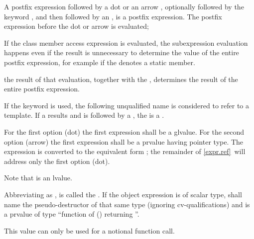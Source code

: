 \pnum
{}%
%
%
%
%
%
%
%
%
%
A postfix expression followed by a dot  or an arrow \tcode{->},
optionally followed by the keyword
, and then followed by an
, is a postfix expression. The postfix
expression before the dot or arrow is evaluated;
\begin{footnote}
If the class member
access expression is evaluated, the subexpression evaluation happens even if the
result is unnecessary to determine
the value of the entire postfix expression, for example if the
 denotes a static member.
\end{footnote}
the result of that evaluation, together with the
, determines the result of the entire postfix
expression.
\begin{note}
If the keyword  is used,
the following unqualified name
is considered to refer to a template.
If a  results and is followed by a \tcode{::},
the  is a .
\end{note}

\pnum
{}%
For the first option (dot) the first expression shall be a glvalue.
For the second option (arrow) the first expression
shall be a prvalue having pointer type.
The expression  is
converted to the equivalent form ; the remainder of
\ref{expr.ref}~will address only the first option (dot).
\begin{footnote}
Note that
 is an lvalue.
\end{footnote}

\pnum
Abbreviating
as ,  is called the .
If the object expression is of scalar type,
 shall name the pseudo-destructor
of that same type (ignoring cv-qualifications) and
 is a prvalue of type ``function of () returning ''.
\begin{note}
This value can only be used
for a notional function call.
\end{note}

